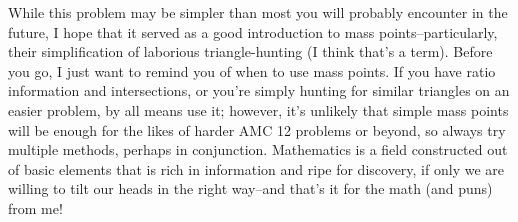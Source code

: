 \documentclass{article}
\begin{document}
While this problem may be simpler than most you will probably encounter in the future, I hope that it served as a good introduction to mass points–particularly, their simplification of laborious triangle-hunting (I think that’s a term). Before you go, I just want to remind you of when to use mass points. If you have ratio information and intersections, or you’re simply hunting for similar triangles on an easier problem, by all means use it; however, it’s unlikely that simple mass points will be enough for the likes of harder AMC 12 problems or beyond, so always try multiple methods, perhaps in conjunction. 
Mathematics is a field constructed out of basic elements that is rich in information and ripe for discovery, if only we are willing to tilt our heads in the right way--and that’s it for the math (and puns) from me!
\end{document}
